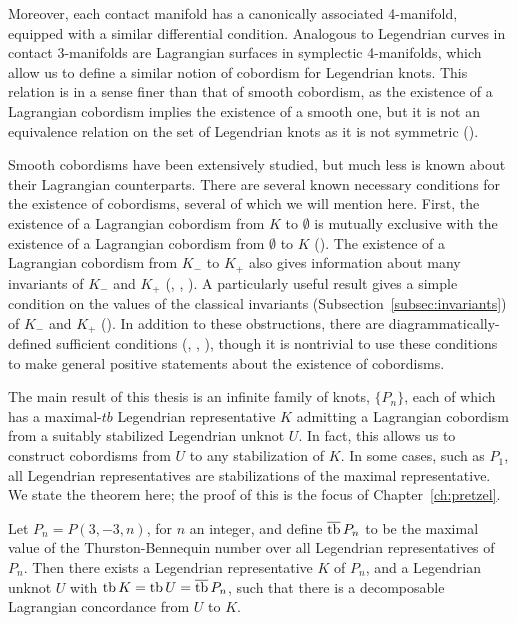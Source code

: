 Moreover, each contact manifold has a canonically associated 4-manifold, equipped with a similar differential condition. Analogous to Legendrian curves in contact 3-manifolds are Lagrangian surfaces in symplectic 4-manifolds, which allow us to define a similar notion of cobordism for Legendrian knots.
This relation is in a sense finer than that of smooth cobordism, as the existence of a Lagrangian cobordism implies the existence of a smooth one, but it is not an equivalence relation on the set of Legendrian knots as it is not symmetric (\cite{chantraine2015}).

Smooth cobordisms have been extensively studied, but much less is known about their Lagrangian counterparts. There are several known necessary conditions for the existence of cobordisms, several of which we will mention here.
First, the existence of a Lagrangian cobordism from $K$ to $\emptyset$ is mutually exclusive with the existence of a Lagrangian cobordism from $\emptyset$ to $K$ (\cite{gromov}).
The existence of a Lagrangian cobordism from $K_-$ to $K_+$ also gives information about many invariants of $K_-$ and $K_+$ (\cite{pan}, \cite{cdrg}, \cite{baldwin}). 
A particularly useful result gives a simple condition on the values of the classical invariants (Subsection~\ref{subsec:invariants}) of $K_-$ and $K_+$ (\cite{chantraine2010}).
In addition to these obstructions, there are diagrammatically-defined sufficient conditions (\cite{bourgeois15}, \cite{lin}, \cite{guadagni}), though it is nontrivial to use these conditions to make general positive statements about the existence of cobordisms.

The main result of this thesis is an infinite family of knots, $\{P_n\}$, each of which has a maximal-$tb$ Legendrian representative $K$ admitting a Lagrangian cobordism from a suitably stabilized Legendrian unknot $U$. In fact, this allows us to construct cobordisms from $U$ to any stabilization of $K$. In some cases, such as $P_1$, all Legendrian representatives are stabilizations of the maximal representative.
We state the theorem here; the proof of this is the focus of Chapter~\ref{ch:pretzel}.

\begin{mythmcopy}
     Let $P_n = P(3, -3, n)$, for $n$ an integer, and define $\overline{\operatorname{tb}}\, P_n$ to be the maximal value of the Thurston-Bennequin number over all Legendrian representatives of $P_n$. Then there exists a Legendrian representative $K$ of $P_n$, and a Legendrian unknot $U$ with $\operatorname{tb} K = \operatorname{tb} U = \overline{\operatorname{tb}}\, P_n$, such that there is a decomposable Lagrangian concordance from $U$ to $K$.
\end{mythmcopy}


